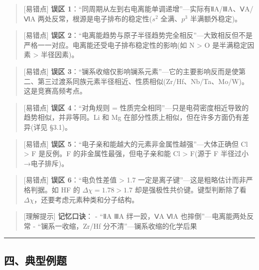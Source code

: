 \begin{quote}
{[}易错点{]} \textbf{误区 1}：``同周期从左到右电离能单调递增''---实际有ⅡA/ⅢA、ⅤA/ⅥA 两处反常，根源是电子排布的稳定性(\(s^2\) 全满、\(p^3\) 半满额外稳定)。
\end{quote}

\begin{quote}
{[}易错点{]} \textbf{误区 2}：``电离能趋势与原子半径趋势完全相反''---大致相反但不是严格一一对应。电离能还受电子排布稳定性的影响(如 N \textgreater{} O 是半满稳定因素 \textgreater{} 半径因素)。
\end{quote}

\begin{quote}
{[}易错点{]} \textbf{误区 3}：``镧系收缩仅影响镧系元素''---它的主要影响反而是使第二、第三过渡系同族元素半径相近、性质相似(Zr/Hf、Nb/Ta、Mo/W)。这是竞赛高频考点。
\end{quote}

\begin{quote}
{[}易错点{]} \textbf{误区 4}：``对角规则 = 性质完全相同''---只是电荷密度相近导致的趋势相似，并非等同。Li 和 Mg 在部分性质上相似，但在许多方面仍有差异(详见 §3.1)。
\end{quote}

\begin{quote}
{[}易错点{]} \textbf{误区 5}：``电子亲和能越大的元素非金属性越强''---大体正确但 Cl \textgreater{} F 是反例。F 的非金属性最强，但电子亲和能 Cl \textgreater{} F(源于 F 半径过小→电子排斥)。
\end{quote}

\begin{quote}
{[}易错点{]} \textbf{误区 6}：``电负性差值 \textgreater{} 1.7 一定是离子键''---这是粗略估计而非严格判据。如 HF 的 \(\Delta\chi=1.78>1.7\) 却是强极性共价键。键型判断除了看\(\Delta\chi\)，还要考虑元素种类和分子结构。
\end{quote}

\begin{quote}
{[}理解提示{]} \textbf{记忆口诀}：
- ``ⅡA ⅢA 绊一跤，ⅤA ⅥA 也摔倒''---电离能两处反常
- ``镧系一收缩，Zr/Hf 分不清''---镧系收缩的化学后果
\end{quote}

\begin{center}\rule{0.5\linewidth}{0.5pt}\end{center}

\subsection{四、典型例题}\label{ux56dbux5178ux578bux4f8bux9898}

